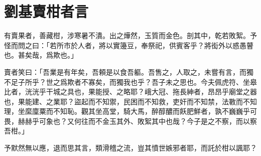\theendnotes

\section[賣柑者言\quad{\small 劉基}]{{\normalsize 劉基}\quad 賣柑者言}
有賣果者，善藏柑，涉寒暑不潰。出之燁然，玉質而金色。{剖其中}，乾若敗絮。予怪而問之曰：「若所市於人者，將以實籩豆，奉祭祀，供賓客乎？將衒外以惑愚瞽{也}。甚矣哉，爲欺也。」

賣者笑曰：「吾業是有年矣，{吾頼是}以食吾軀。吾售之，人取之，未{嘗}有言，而獨不足子所乎？世之爲欺者不寡矣，而獨我也乎？吾子未之思也。今夫佩虎符、坐皋比者，洸洸乎干城之具也，果能授、之略耶？峨大冠、拖長紳者，昂昂乎廟堂之器也，果能建、之業耶？盜起而不知禦，民困而不知救，吏奸而不知禁，法斁而不知理，坐縻廩粟而不知恥。觀其坐高堂，騎大馬，醉醇醲而飫肥鮮者，孰不巍巍乎可畏，赫赫乎可象也？又何往而不金玉其外、敗絮其中也哉？今子是之不察，而以察吾柑。」

予默{然}無以應，退而思其言，類滑稽之流，豈其憤世嫉邪者耶，而託於柑以諷耶？%

\theendnotes

